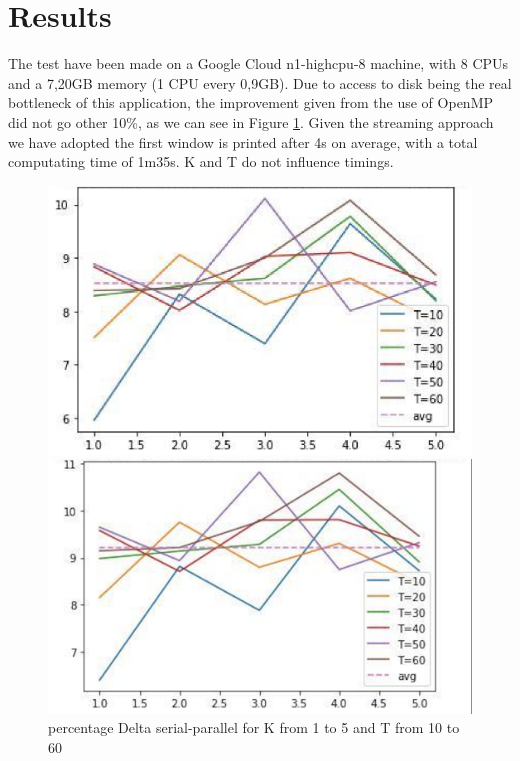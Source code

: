 \documentclass[a4paper]{article}
\begin{document}
\section{Results}
The test have been made on a Google Cloud n1-highcpu-8 machine, with 8 CPUs and a 7,20GB memory (1 CPU every 0,9GB). 
Due to access to disk being the real bottleneck of this application, the improvement given from the use of OpenMP did not go other 10\%, as we can see in Figure \ref{fig:percentage}.
Given the streaming approach we have adopted the first window is printed after 4s on average, with a total computating time of 1m35s.
K and T do not influence timings.

\begin{figure}[!htb]
  \includegraphics[width=\linewidth]{gross.png}
  \caption{Delta serial-parallel for K from 1 to 5 and T from 10 to 60}\label{fig:gross}
\endminipage\hfill
{}
  \includegraphics[width=\linewidth]{percentage.png}
  \caption{percentage Delta serial-parallel for K from 1 to 5 and T from 10 to 60\label{fig:percentage}}
\endminipage\hfill
\end{figure}
\end{document}
